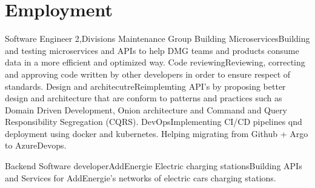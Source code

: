 \section{Employment}
  \resumeSubHeadingListStart
    \resumeSubheading
    {Software Engineer 2,}{Divisions Maintenance Group}{}
    {}
      \resumeItemListStart
        \renewcommand{\labelitemii}{\raisebox{.2cm}{$\bullet$}}
        \resumeItem
        {Building Microservices}{Building and testing microservices and APIs to help DMG teams and products consume data in a more efficient and optimized way.}
        \resumeItem
        {Code reviewing}{Reviewing, correcting and approving code written by other developers in order to ensure respect of standards.}
        \renewcommand{\labelitemii}{\raisebox{.4cm}{$\bullet$}}
        \resumeItem
        {Design and architecutre}{Reimplemting API's by proposing better design and architecture that are conform to patterns and practices such as Domain Driven Development, Onion architecture and Command and Query Responsibility Segregation (CQRS).}
        \renewcommand{\labelitemii}{\raisebox{.2cm}{$\bullet$}}
        \resumeItem
        {DevOps}{Implementing CI/CD pipelines qnd deployment using docker and kubernetes. Helping migrating from Github + Argo to AzureDevops.}
        \renewcommand{\labelitemii}{\scriptsize \raisebox{.25cm}{\ding{118}}}
      \resumeItemListEnd

    \resumeSubheading
    {Backend Software developer}{AddEnergie}{}
    {}
      \resumeItemListStart
        \renewcommand{\labelitemii}{\raisebox{.2cm}{$\bullet$}}
        \resumeItem
        {Electric charging stations}{Building APIs and Services for AddEnergie's networks of electric cars charging stations.}
        \renewcommand{\labelitemii}{\scriptsize \raisebox{.25cm}{\ding{118}}}
      \resumeItemListEnd

